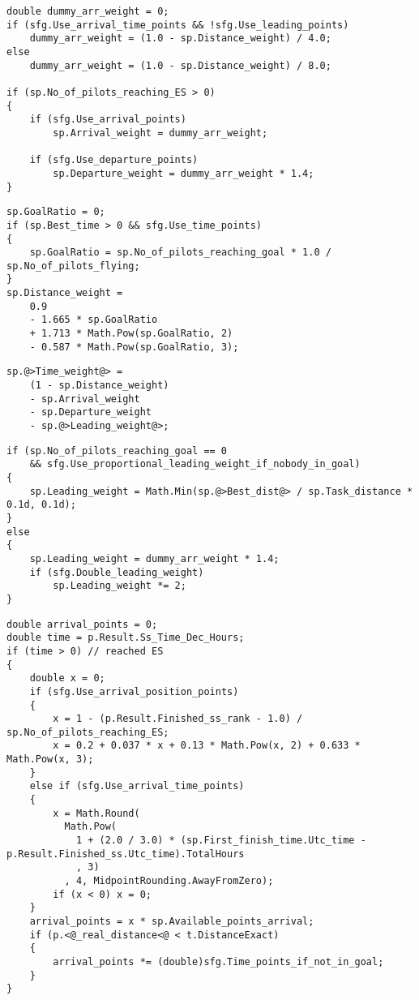 \documentclass[gap.tex]{subfiles}
\begin{document}
\begin{lstlisting}[style=base, caption={Arrival weight and departure weight don't depend on distance inputs.}]
double dummy_arr_weight = 0;
if (sfg.Use_arrival_time_points && !sfg.Use_leading_points)
    dummy_arr_weight = (1.0 - sp.Distance_weight) / 4.0;
else
    dummy_arr_weight = (1.0 - sp.Distance_weight) / 8.0;

if (sp.No_of_pilots_reaching_ES > 0)
{
    if (sfg.Use_arrival_points)
        sp.Arrival_weight = dummy_arr_weight;

    if (sfg.Use_departure_points)
        sp.Departure_weight = dummy_arr_weight * 1.4;
}
\end{lstlisting}

\begin{lstlisting}[style=base, caption={Distance weight doesn't depend on distance inputs.}]
sp.GoalRatio = 0;
if (sp.Best_time > 0 && sfg.Use_time_points)
{
    sp.GoalRatio = sp.No_of_pilots_reaching_goal * 1.0 / sp.No_of_pilots_flying;
}
sp.Distance_weight =
    0.9
    - 1.665 * sp.GoalRatio
    + 1.713 * Math.Pow(sp.GoalRatio, 2)
    - 0.587 * Math.Pow(sp.GoalRatio, 3);
\end{lstlisting}

\begin{lstlisting}[style=base, caption={Time weight depends on \textcolor{red}{bonus} distance.}]
sp.@>Time_weight@> =
    (1 - sp.Distance_weight)
    - sp.Arrival_weight
    - sp.Departure_weight
    - sp.@>Leading_weight@>;
\end{lstlisting}

\begin{lstlisting}[style=base, caption={Leading weight depends on \textcolor{red}{bonus} distance.}]
if (sp.No_of_pilots_reaching_goal == 0
    && sfg.Use_proportional_leading_weight_if_nobody_in_goal)
{
    sp.Leading_weight = Math.Min(sp.@>Best_dist@> / sp.Task_distance * 0.1d, 0.1d);
}
else
{
    sp.Leading_weight = dummy_arr_weight * 1.4;
    if (sfg.Double_leading_weight)
        sp.Leading_weight *= 2;
}
\end{lstlisting}

\pagebreak

\begin{lstlisting}[style=base, caption={Arrival point allocation depends on \textcolor{blue}{real} distance.}]
double arrival_points = 0;
double time = p.Result.Ss_Time_Dec_Hours;
if (time > 0) // reached ES
{
    double x = 0;
    if (sfg.Use_arrival_position_points)
    {
        x = 1 - (p.Result.Finished_ss_rank - 1.0) / sp.No_of_pilots_reaching_ES;
        x = 0.2 + 0.037 * x + 0.13 * Math.Pow(x, 2) + 0.633 * Math.Pow(x, 3);
    }
    else if (sfg.Use_arrival_time_points)
    {
        x = Math.Round(
          Math.Pow(
            1 + (2.0 / 3.0) * (sp.First_finish_time.Utc_time - p.Result.Finished_ss.Utc_time).TotalHours
            , 3)
          , 4, MidpointRounding.AwayFromZero);
        if (x < 0) x = 0;
    }
    arrival_points = x * sp.Available_points_arrival;
    if (p.<@_real_distance<@ < t.DistanceExact)
    {
        arrival_points *= (double)sfg.Time_points_if_not_in_goal;
    }
}
\end{lstlisting}
\end{document}
